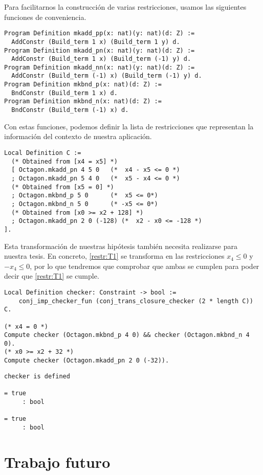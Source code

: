 Para facilitarnos la construcción de varias restricciones, usamos las siguientes
funciones de conveniencia.

\begin{verbatim}
Program Definition mkadd_pp(x: nat)(y: nat)(d: Z) :=
  AddConstr (Build_term 1 x) (Build_term 1 y) d.
Program Definition mkadd_pn(x: nat)(y: nat)(d: Z) :=
  AddConstr (Build_term 1 x) (Build_term (-1) y) d.
Program Definition mkadd_nn(x: nat)(y: nat)(d: Z) :=
  AddConstr (Build_term (-1) x) (Build_term (-1) y) d.
Program Definition mkbnd_p(x: nat)(d: Z) :=
  BndConstr (Build_term 1 x) d.
Program Definition mkbnd_n(x: nat)(d: Z) :=
  BndConstr (Build_term (-1) x) d.
\end{verbatim}

Con estas funciones, podemos definir la lista de restricciones que representan
la información del contexto de nuestra aplicación.

\begin{verbatim}
Local Definition C := 
  (* Obtained from [x4 = x5] *)
  [ Octagon.mkadd_pn 4 5 0   (*  x4 - x5 <= 0 *)
  ; Octagon.mkadd_pn 5 4 0   (*  x5 - x4 <= 0 *)
  (* Obtained from [x5 = 0] *)
  ; Octagon.mkbnd_p 5 0      (*  x5 <= 0*)
  ; Octagon.mkbnd_n 5 0      (* -x5 <= 0*)
  (* Obtained from [x0 >= x2 + 128] *)
  ; Octagon.mkadd_pn 2 0 (-128) (*  x2 - x0 <= -128 *)
].
\end{verbatim}

Esta transformación de nuestras hipótesis también necesita realizarse para
nuestra tesis. En concreto, \ref{restr:T1}  se transforma en las 
restricciones $x_4 \le 0$ y $-x_4 \le 0$,  por lo que tendremos que comprobar 
que ambas se cumplen para poder decir que \ref{restr:T1} se cumple.

\begin{verbatim}
Local Definition checker: Constraint -> bool := 
    conj_imp_checker_fun (conj_trans_closure_checker (2 * length C)) C.

(* x4 = 0 *)
Compute checker (Octagon.mkbnd_p 4 0) && checker (Octagon.mkbnd_n 4 0).
(* x0 >= x2 + 32 *)
Compute checker (Octagon.mkadd_pn 2 0 (-32)).
\end{verbatim}
\vspace{-\baselineskip*3/2}
\begin{verbatim}
checker is defined

= true
     : bool

= true
     : bool
\end{verbatim}

\section{Trabajo futuro}
\label{sect:trabajo-futuro}

